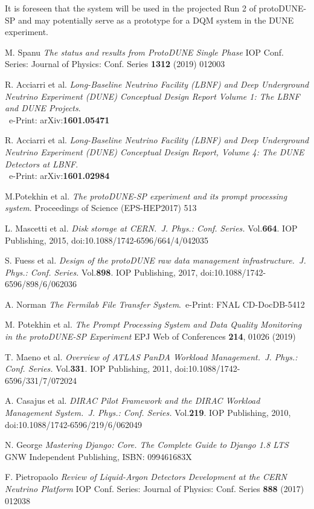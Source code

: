 \documentclass{webofc}
\newcommand{\pd}{protoDUNE\xspace}
\begin{document}
\noindent It is foreseen that the system will be used in the projected Run 2 of \pd-SP and may potentially
serve as a prototype for a DQM system in the DUNE experiment.



\begin{thebibliography}{99}

M. Spanu
\emph{The status and results from ProtoDUNE Single Phase}
IOP Conf. Series: Journal of Physics: Conf. Series \textbf{1312} (2019) 012003

R. Acciarri et al.
\emph{Long-Baseline Neutrino Facility (LBNF) and Deep Underground Neutrino Experiment (DUNE) Conceptual Design Report Volume 1: The LBNF and DUNE Projects}.\\ ~e-Print: arXiv:\textbf{1601.05471}


R. Acciarri et al.
\emph{Long-Baseline Neutrino Facility (LBNF) and Deep Underground Neutrino Experiment (DUNE) Conceptual Design Report, Volume 4: The DUNE Detectors at LBNF}.\\~e-Print: arXiv:\textbf{1601.02984}

 M.Potekhin et al. \emph{The protoDUNE-SP experiment and its prompt
processing system}. Proceedings of Science (EPS-HEP2017) 513


L. Mascetti et al. \emph{Disk storage at CERN.~J. Phys.: Conf. Series.} Vol.\textbf{664}. IOP Publishing, 2015,
doi:10.1088/1742-6596/664/4/042035

S. Fuess et al. \emph{Design of the protoDUNE raw data management
infrastructure.~J. Phys.: Conf. Series.} Vol.\textbf{898}. IOP Publishing, 2017,
doi:10.1088/1742-6596/898/6/062036

A. Norman \emph{The Fermilab File Transfer System}.~e-Print: FNAL CD-DocDB-5412

 M. Potekhin et al. \emph{The Prompt Processing System
and Data Quality Monitoring in the protoDUNE-SP Experiment}
EPJ Web of Conferences \textbf{214}, 01026 (2019)

T. Maeno et al. \emph{Overview of ATLAS PanDA Workload Management.~J. Phys.: Conf. Series.} Vol.\textbf{331}. IOP Publishing, 2011,
doi:10.1088/1742-6596/331/7/072024


A. Casajus et al.  \emph{DIRAC Pilot Framework and the DIRAC
Workload Management System.~J. Phys.: Conf. Series.} Vol.\textbf{219}. IOP Publishing, 2010,
doi:10.1088/1742-6596/219/6/062049


N. George \emph{Mastering Django: Core. The Complete Guide to Django 1.8 LTS}~ GNW Independent Publishing, ISBN: 099461683X

 F. Pietropaolo \emph{Review of Liquid-Argon Detectors Development at the CERN
Neutrino Platform}
IOP Conf. Series:  Journal of Physics: Conf. Series \textbf{888} (2017) 012038


\end{thebibliography}
\end{document}
